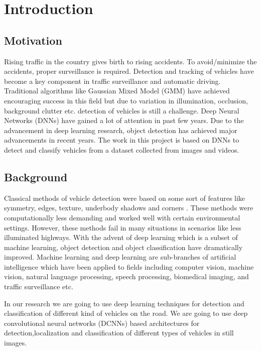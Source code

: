 \chapter{Introduction}
\label{1}
\section{Motivation}

Rising traffic in the country gives birth to rising accidents. To 
avoid/minimize the accidents, proper surveillance is required. Detection 
and tracking of vehicles have become a key component in traffic 
surveillance and automatic driving. Traditional algorithms like Gaussian 
Mixed Model (GMM) have achieved encouraging success in this field \cite{chap_1_article:1} but due 
to variation in illumination, occlusion, background clutter etc. detection 
of vehicles is still a challenge. 
Deep Neural Networks (DNNs) have gained a lot of attention in 
past few years. Due to the advancement  in deep learning research, object 
detection has achieved major advancements in recent years. The work 
in this project is based on DNNs to detect and classify vehicles from 
a dataset collected from images and videos.

\section{Background}

Classical methods of vehicle detection were based on some 
sort of features like symmetry, edges, texture, underbody shadows 
and corners \cite{chap_1_article:2}. These methods were computationally less demanding and
worked well with certain environmental settings. However, these methods fail in many situations 
in scenarios like less illuminated highways. With the advent of 
deep learning which is a subset of machine learning, object detection and 
object classification have dramatically improved. Machine learning 
and deep learning are sub-branches of artificial intelligence which  
have been applied to fields including computer vision, machine vision,
natural language processing, speech processing, biomedical imaging,
and traffic surveillance etc. 

In our research we are going to use deep learning techniques for detection
and classification of different kind of vehicles on the road.
We are going to use deep convolutional neural networks (DCNNs)
based architectures for detection,localization and classification of
different types of vehicles in still images.  

